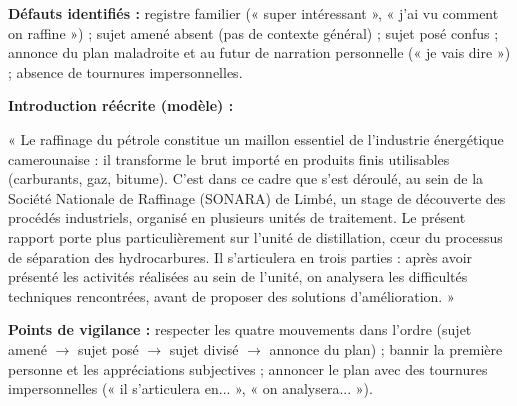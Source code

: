 \documentclass[11pt]{article}
\begin{document}
\begin{corrige}
\textbf{Défauts identifiés :} registre familier (« super intéressant », « j'ai vu comment on raffine ») ; sujet amené absent (pas de contexte général) ; sujet posé confus ; annonce du plan maladroite et au futur de narration personnelle (« je vais dire ») ; absence de tournures impersonnelles.

\textbf{Introduction réécrite (modèle) :}

« Le raffinage du pétrole constitue un maillon essentiel de l'industrie énergétique camerounaise : il transforme le brut importé en produits finis utilisables (carburants, gaz, bitume). C'est dans ce cadre que s'est déroulé, au sein de la Société Nationale de Raffinage (SONARA) de Limbé, un stage de découverte des procédés industriels, organisé en plusieurs unités de traitement. Le présent rapport porte plus particulièrement sur l'unité de distillation, cœur du processus de séparation des hydrocarbures. Il s'articulera en trois parties : après avoir présenté les activités réalisées au sein de l'unité, on analysera les difficultés techniques rencontrées, avant de proposer des solutions d'amélioration. »

\textbf{Points de vigilance :} respecter les quatre mouvements dans l'ordre (sujet amené $\rightarrow$ sujet posé $\rightarrow$ sujet divisé $\rightarrow$ annonce du plan) ; bannir la première personne et les appréciations subjectives ; annoncer le plan avec des tournures impersonnelles (« il s'articulera en... », « on analysera... »).
\end{corrige}
\end{document}
